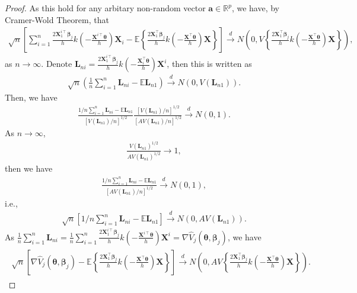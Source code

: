 \documentclass[12pt]{article}
\newcommand{\bs}{ \boldsymbol}
\newcommand{\lt}{\left}
\newcommand{\rt}{\right}
\begin{document}
\begin{proof}
	As this hold for any arbitary non-random vector $\bs{a}\in \mathbb{R}^p$, we have, by Cramer-Wold Theorem, that
	\begin{gather*}
	\sqrt{n}\lt[\sum_{i=1}^{n}\frac{2\bs{X}_{1}^{i\intercal}\bs{\beta}_j}{h}k\lt(-\frac{\bs{X}^{i\intercal}\bs{\theta}}{h}\rt)\bs{X}_{i}-\mathbb{E}\lt\{\frac{2\bs{X}_{1}^{\intercal}\bs{\beta}_j}{h}k\lt(-\frac{\bs{X}^{\intercal}\bs{\theta}}{h}\rt)\bs{X}\rt\}\rt]\overset{d}{\to}N\lt(0,V\lt\{\frac{2\bs{X}_{1}^{\intercal}\bs{\beta}_j}{h}k\lt(-\frac{\bs{X}^{\intercal}\bs{\theta}}{h}\rt)\bs{X}\rt\}\rt),
	\end{gather*}
	as $n \to \infty$. Denote $\bs{L}_{ni}=\frac{2\bs{X}_{1}^{i\intercal}\bs{\beta}_j}{h}k\lt(-\frac{\bs{X}_{i}^{\intercal}\bs{\theta}}{h}\rt)\bs{X}^{i}$,
	then this is written as
	\begin{gather*}
	\sqrt{n}\lt(\frac{1}{n}\sum_{i=1}^{n}\bs{L}_{ni}-\mathbb{E}\bs{L}_{n1}\rt)\overset{d}{\to}N\lt(0,V\lt(\bs{L}_{n1}\rt)\rt).
	\end{gather*}
	Then, we have
	\begin{gather*}
	\frac{1/n\sum_{i=1}^{n}\bs{L}_{ni}-\mathbb{E}\bs{L}_{n1}}{[V(\bs{L}_{n1})/n]^{1/2}}\frac{[V(\bs{L}_{n1})/n]^{1/2}}{\lt[AV(\bs{L}_{n1})/n\rt]^{1/2}}\overset{d}{\to}N(0,1).
	\end{gather*}
	As  $n \to \infty$, 
	\begin{gather*}
	\frac{V(\bs{L}_{n1})^{1/2}}{AV(\bs{L}_{n1})^{1/2}}\to1,
	\end{gather*}
	then we have
	\begin{gather*}
	\frac{1/n\sum_{i=1}^{n}\bs{L}_{ni}-\mathbb{E}\bs{L}_{n1}}{[AV(\bs{L}_{n1})/n]^{1/2}}\overset{d}{\to}N(0,1),
	\end{gather*}
	i.e.,
	\begin{gather*}
	\sqrt{n}\lt[1/n\sum_{i=1}^{n}\bs{L}_{ni}-\mathbb{E}\bs{L}_{n1}\rt]\overset{d}{\to}N\lt(0,AV(\bs{L}_{n1})\rt).
	\end{gather*}
	As $\frac{1}{n}\sum_{i=1}^{n}\bs{L}_{ni} = \frac{1}{n}\sum_{i=1}^n\frac{2\bs{X}_{1}^{i\intercal}\bs{\beta}_j}{h}k\lt(-\frac{\bs{X}^{i\intercal}\bs{\theta}}{h}\rt)\bs{X}^{i} =\nabla\widehat{V}_j\lt(\bs{\theta}, \bs{\beta}_j\rt)$, we have
	\begin{gather}
	\begin{flalign*}
	\sqrt{n}\lt[\nabla\widehat{V}_j\lt(\bs{\theta}, \bs{\beta}_j\rt) -\mathbb{E}\lt\{\frac{2\bs{X}_{1}^{\intercal}\bs{\beta}_j}{h}k\lt(-\frac{\bs{X}^{\intercal}\bs{\theta}}{h}\rt)\bs{X}\rt\}\rt]\overset{d}{\to}N\lt(0,AV\lt\{\frac{2\bs{X}_1^{\intercal}\bs{\beta}_j}{h}k\lt(-\frac{\bs{X}^{\intercal}\bs{\theta}}{h}\rt)\bs{X}\rt\}\rt).
	\end{flalign*}
	\end{gather}
\end{proof}
\end{document}
